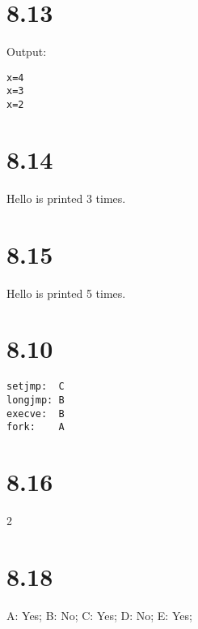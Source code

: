\documentclass[fleqn]{article}
\begin{document}


\section*{8.13}

Output:

\begin{verbatim}
x=4
x=3
x=2
\end{verbatim}

\section*{8.14}

Hello is printed 3 times.

\section*{8.15}

Hello is printed 5 times.

\section*{8.10}

\begin{verbatim}
setjmp:  C
longjmp: B
execve:  B
fork:    A
\end{verbatim}

\section*{8.16}

2

\section*{8.18}

A: Yes;
B: No;
C: Yes;
D: No;
E: Yes;
\end{document}
